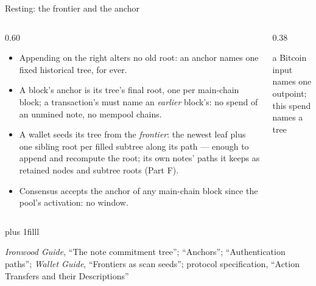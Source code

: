 \documentclass[aspectratio=169,11pt]{beamer}
\newcommand{\src}[1]{\par\vskip0pt plus 1filll
  {\fontsize{6}{7.2}\selectfont\color{arbdim}\raggedright #1\par}}
\begin{document}
\begin{frame}{Resting: the frontier and the anchor}
\begin{columns}[c]
\begin{column}{0.60\textwidth}
\begin{itemize}\small
  \item Appending on the right alters no old root: an anchor names one
    fixed historical tree, for ever.
  \item A block's anchor is its tree's final root, one per main-chain
    block; a transaction's must name an \emph{earlier} block's: no
    spend of an unmined note, no mempool chains.
  \item A wallet seeds its tree from the \emph{frontier}: the newest
    leaf plus one sibling root per filled subtree along its path ---
    enough to append and recompute the root; its own notes' paths it
    keeps as retained nodes and subtree roots (Part F).
  \item Consensus accepts the anchor of any main-chain block since the
    pool's activation: no window.
\end{itemize}
\end{column}
\begin{column}{0.38\textwidth}
\centering
\TreeFig[anchor]
\par\smallskip
{\scriptsize a Bitcoin input names one outpoint;\\ this spend names a
  tree}
\end{column}
\end{columns}
\src{\emph{Ironwood Guide}, ``The note commitment tree'';
  ``Anchors''; ``Authentication paths'';
  \emph{Wallet Guide}, ``Frontiers as scan seeds'';
  protocol specification, ``Action Transfers and their Descriptions''}
\end{frame}
\end{document}
